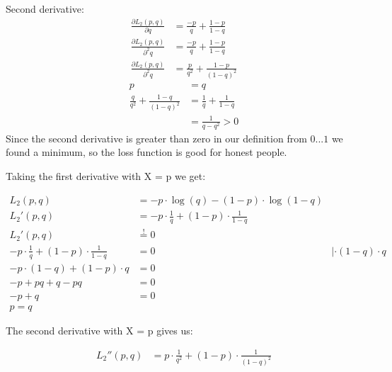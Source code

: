 Second derivative:
\begin{align*}
\frac{\partial L_2\left(p, q\right)}{\partial q} &= \frac{-p}{q} + \frac{1-p}{1-q} \\
\frac{\partial L_2\left(p, q\right)}{\partial^2 q} &= \frac{-p}{q} + \frac{1-p}{1-q} \\
\frac{\partial L_2\left(p, q\right)}{\partial^2 q} &= \frac{p}{q^2} + \frac{1-p}{\left(1-q\right)^2}
\end{align*}
\begin{align*}
p &= q\\
\frac{q}{q^2} + \frac{1-q}{\left(1-q\right)^2} &= \frac{1}{q} + \frac{1}{1-q} \\
&= \frac{1}{q-q^2} > 0
\end{align*}
Since the second derivative is greater than zero in our definition from $0...1$ we found a minimum, so the loss function is good for honest people.

Taking the first derivative with X = p we get:

\begin{align*}
  L_2 (p,q) &= -p \cdot \log{\left(q \right)} - (1-p) \cdot \log{\left(1-q \right)} \\
  L_2' (p,q) &= -p \cdot \frac{1}{q} + (1-p) \cdot \frac{1}{1-q} \\
  L_2' (p,q) &\stackrel{!}{=} 0 \\
   -p \cdot \frac{1}{q} + (1-p) \cdot \frac{1}{1-q} &= 0 &| \cdot (1-q) \cdot q \\
  -p \cdot (1-q) + (1-p) \cdot q & = 0 \\
  -p + pq + q - pq &= 0\\
  -p + q &= 0 \\
  p = q
\end{align*}

 The second derivative with X = p gives us:
 
\begin{align*}
   L_2'' (p,q) &= p \cdot \frac{1}{q^2} + (1-p) \cdot \frac{1}{(1-q)^2}\\
\end{align*}
